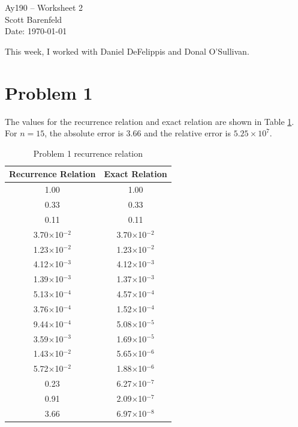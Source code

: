 \documentclass[11pt,letterpaper]{article}
\begin{document}
\begin{center}
\Large
Ay190 -- Worksheet 2\\
Scott Barenfeld\\
Date: \today
\end{center}

This week, I worked with Daniel DeFelippis and Donal O'Sullivan.

\section{Problem 1}
The values for the recurrence relation and exact relation are shown in 
Table \ref{tab:one}.  For $n=15$, the absolute error is 3.66 and the 
relative error is $5.25\times10^{7}$.

\begin{table}[!h]
\centering
\caption{Problem 1 recurrence relation}
\begin{tabular}{c|c}
\hline
Recurrence Relation & Exact Relation\\
\hline
\hline
1.00 & 1.00\\
0.33 & 0.33\\
0.11 & 0.11\\
3.70$\times$10$^{-2}$ & 3.70$\times$10$^{-2}$\\
1.23$\times$10$^{-2}$ & 1.23$\times$10$^{-2}$\\
4.12$\times$10$^{-3}$ & 4.12$\times$10$^{-3}$\\
1.39$\times$10$^{-3}$ & 1.37$\times$10$^{-3}$\\
5.13$\times$10$^{-4}$ & 4.57$\times$10$^{-4}$\\
3.76$\times$10$^{-4}$ & 1.52$\times$10$^{-4}$\\
9.44$\times$10$^{-4}$ & 5.08$\times$10$^{-5}$\\
3.59$\times$10$^{-3}$ & 1.69$\times$10$^{-5}$\\
1.43$\times$10$^{-2}$ & 5.65$\times$10$^{-6}$\\
5.72$\times$10$^{-2}$ & 1.88$\times$10$^{-6}$\\
0.23 & 6.27$\times$10$^{-7}$\\
0.91 & 2.09$\times$10$^{-7}$\\
3.66 & 6.97$\times$10$^{-8}$\\
\hline
\end{tabular}
\label{tab:one}
\end{table}
\end{document}
